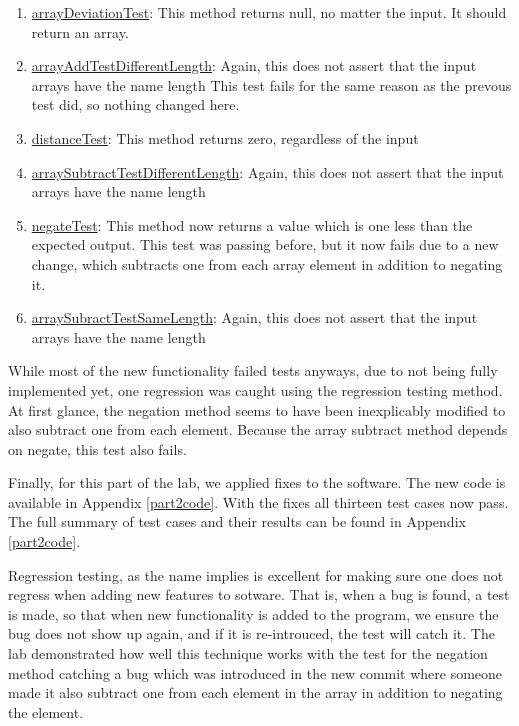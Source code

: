 \begin{enumerate}
  \item \underline{arrayDeviationTest}:
    This method returns null, no matter the input. It should return an array.
  \item \underline{arrayAddTestDifferentLength}:
    Again, this does not assert that the input arrays have the name length
    This test fails for the same reason as the prevous test did, so nothing
    changed here.
  \item \underline{distanceTest}:
    This method returns zero, regardless of the input
  \item \underline{arraySubtractTestDifferentLength}:
    Again, this does not assert that the input arrays have the name length
  \item \underline{negateTest}:
    This method now returns a value which is one less than the expected output.
    This test was passing before, but it now fails due to a new change, which
    subtracts one from each array element in addition to negating it.
  \item \underline{arraySubractTestSameLength}:
    Again, this does not assert that the input arrays have the name length
\end{enumerate}

While most of the new functionality failed tests anyways, due to not being fully
implemented yet, one regression was caught using the regression testing method.
At first glance, the negation method seems to have been inexplicably modified to
also subtract one from each element. Because the array subtract method depends
on negate, this test also fails. 


Finally, for this part of the lab, we applied fixes to the software. The new
code is available in Appendix \ref{part2code}. With the fixes all thirteen test
cases now pass. The full summary of test cases and their results can be found in
Appendix \ref{part2code}.

Regression testing, as the name implies is excellent for making sure one does
not regress when adding new features to sotware. That is, when a bug is found, a
test is made, so that when new functionality is added to the program, we ensure
the bug does not show up again, and if it is re-introuced, the test will catch
it. The lab demonstrated how well this technique works with the test for the
negation method catching a bug which was introduced in the new commit where
someone made it also subtract one from each element in the array in addition to
negating the element.
